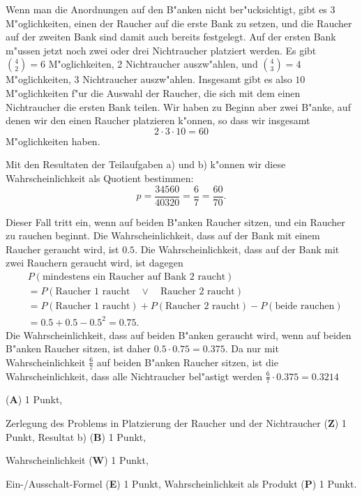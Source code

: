 \begin{loesung}
\begin{teilaufgaben}
Wenn man die Anordnungen auf den B"anken nicht ber"ucksichtigt,
gibt es $3$ M"oglichkeiten, einen der Raucher auf die erste Bank zu setzen,
und die Raucher auf der zweiten Bank sind damit auch bereits festgelegt.
Auf der ersten Bank m"ussen jetzt noch zwei oder drei Nichtraucher platziert
werden.
Es gibt $\binom{4}{2}=6$ M"oglichkeiten, 2 Nichtraucher auszw"ahlen, und
$\binom{4}{3}=4$ M"oglichkeiten, 3 Nichtraucher auszw"ahlen.
Insgesamt gibt es also $10$ M"oglichkeiten f"ur die Auswahl der Raucher,
die sich mit dem einen Nichtraucher die ersten Bank teilen.
Wir haben zu Beginn aber zwei B"anke, auf denen wir den einen Raucher
platzieren k"onnen, so dass wir insgesamt
\[
2\cdot 3\cdot 10 = 60
\]
M"oglichkeiten haben.
\item
Mit den Resultaten der Teilaufgaben a) und b) k"onnen wir diese
Wahrscheinlichkeit als Quotient bestimmen:
\[
p= \frac{34560}{40320}=\frac{6}{7}=\frac{60}{70}.
\]
\item
Dieser Fall tritt ein, wenn auf beiden B"anken Raucher sitzen,
und ein Raucher zu rauchen beginnt.
Die Wahrscheinlichkeit, dass auf der Bank mit einem Raucher geraucht
wird, ist $0.5$.
Die Wahrscheinlichkeit, dass auf der Bank mit zwei Rauchern geraucht
wird, ist dagegen
\begin{align*}
&
P(\text{mindestens ein Raucher auf Bank 2 raucht})
\\
&=
P(\text{Raucher 1 raucht}\quad\vee\quad\text{Raucher 2 raucht})
\\
&=
P(\text{Raucher 1 raucht})
+
P(\text{Raucher 2 raucht})
-
P(\text{beide rauchen})
\\
&=
0.5+0.5-0.5^2 = 0.75.
\end{align*}
Die Wahrscheinlichkeit, dass auf beiden B"anken geraucht wird, wenn auf
beiden B"anken Raucher sitzen, ist daher $0.5\cdot 0.75 = 0.375$.
Da nur mit Wahrscheinlichkeit $\frac{6}{7}$ auf beiden B"anken
Raucher sitzen, ist die Wahrscheinlichkeit, dass alle Nichtraucher
bel"astigt werden $\frac{6}{7}\cdot 0.375=0.3214$
\qedhere
\end{teilaufgaben}
\end{loesung}

\begin{bewertung}
\begin{teilaufgaben}
\item
({\bf A}) 1 Punkt,
\item
Zerlegung des Problems in Platzierung der Raucher und der Nichtraucher
({\bf Z}) 1 Punkt,
Resultat b) ({\bf B}) 1 Punkt,
\item
Wahrscheinlichkeit ({\bf W}) 1 Punkt,
\item
Ein-/Ausschalt-Formel ({\bf E}) 1 Punkt,
Wahrscheinlichkeit als Produkt ({\bf P}) 1 Punkt.
\end{teilaufgaben}
\end{bewertung}


